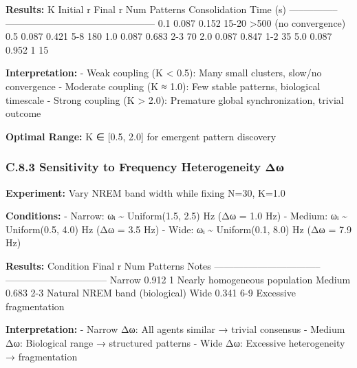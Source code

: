 \documentclass[
]{article}
\begin{document}
\textbf{Results:} \textbar{} K \textbar{} Initial r \textbar{} Final r
\textbar{} Num Patterns \textbar{} Consolidation Time (s) \textbar{}
\textbar-----\textbar-----------\textbar---------\textbar--------------\textbar------------------------\textbar{}
\textbar{} 0.1 \textbar{} 0.087 \textbar{} 0.152 \textbar{} 15-20
\textbar{} \textgreater500 (no convergence) \textbar{} \textbar{} 0.5
\textbar{} 0.087 \textbar{} 0.421 \textbar{} 5-8 \textbar{} 180
\textbar{} \textbar{} 1.0 \textbar{} 0.087 \textbar{} 0.683 \textbar{}
2-3 \textbar{} 70 \textbar{} \textbar{} 2.0 \textbar{} 0.087 \textbar{}
0.847 \textbar{} 1-2 \textbar{} 35 \textbar{} \textbar{} 5.0 \textbar{}
0.087 \textbar{} 0.952 \textbar{} 1 \textbar{} 15 \textbar{}

\textbf{Interpretation:} - Weak coupling (K \textless{} 0.5): Many small
clusters, slow/no convergence - Moderate coupling (K ≈ 1.0): Few stable
patterns, biological timescale - Strong coupling (K \textgreater{} 2.0):
Premature global synchronization, trivial outcome

\textbf{Optimal Range:} K ∈ {[}0.5, 2.0{]} for emergent pattern
discovery

\subsubsection{C.8.3 Sensitivity to Frequency Heterogeneity
Δω}\label{c.8.3-sensitivity-to-frequency-heterogeneity-ux3b4ux3c9}

\textbf{Experiment:} Vary NREM band width while fixing N=30, K=1.0

\textbf{Conditions:} - Narrow: ωᵢ \textasciitilde{} Uniform(1.5, 2.5) Hz
(Δω = 1.0 Hz) - Medium: ωᵢ \textasciitilde{} Uniform(0.5, 4.0) Hz (Δω =
3.5 Hz) - Wide: ωᵢ \textasciitilde{} Uniform(0.1, 8.0) Hz (Δω = 7.9 Hz)

\textbf{Results:} \textbar{} Condition \textbar{} Final r \textbar{} Num
Patterns \textbar{} Notes \textbar{}
\textbar-----------\textbar---------\textbar--------------\textbar--------------------------------\textbar{}
\textbar{} Narrow \textbar{} 0.912 \textbar{} 1 \textbar{} Nearly
homogeneous population \textbar{} \textbar{} Medium \textbar{} 0.683
\textbar{} 2-3 \textbar{} Natural NREM band (biological) \textbar{}
\textbar{} Wide \textbar{} 0.341 \textbar{} 6-9 \textbar{} Excessive
fragmentation \textbar{}

\textbf{Interpretation:} - Narrow Δω: All agents similar → trivial
consensus - Medium Δω: Biological range → structured patterns - Wide Δω:
Excessive heterogeneity → fragmentation
\end{document}

